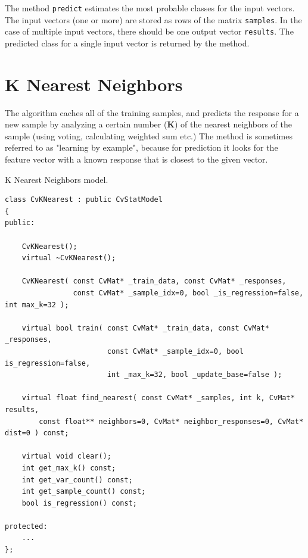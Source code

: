 
The method \texttt{predict} estimates the most probable classes for the input vectors. The input vectors (one or more) are stored as rows of the matrix \texttt{samples}. In the case of multiple input vectors, there should be one output vector \texttt{results}. The predicted class for a single input vector is returned by the method.

\section{K Nearest Neighbors}

The algorithm caches all of the training samples, and predicts the response for a new sample by analyzing a certain number (\textbf{K}) of the nearest neighbors of the sample (using voting, calculating weighted sum etc.) The method is sometimes referred to as "learning by example", because for prediction it looks for the feature vector with a known response that is closest to the given vector.


K Nearest Neighbors model.

\begin{lstlisting}
class CvKNearest : public CvStatModel
{
public:

    CvKNearest();
    virtual ~CvKNearest();

    CvKNearest( const CvMat* _train_data, const CvMat* _responses,
                const CvMat* _sample_idx=0, bool _is_regression=false, int max_k=32 );

    virtual bool train( const CvMat* _train_data, const CvMat* _responses,
                        const CvMat* _sample_idx=0, bool is_regression=false,
                        int _max_k=32, bool _update_base=false );

    virtual float find_nearest( const CvMat* _samples, int k, CvMat* results,
        const float** neighbors=0, CvMat* neighbor_responses=0, CvMat* dist=0 ) const;

    virtual void clear();
    int get_max_k() const;
    int get_var_count() const;
    int get_sample_count() const;
    bool is_regression() const;

protected:
    ...
};
\end{lstlisting}



